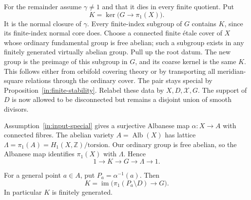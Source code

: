 For the remainder assume \(\gamma\ne1\) and that it dies in every
finite quotient.  Put
\[
 K=\ker\bigl(G\longrightarrow\pi_1(X)\bigr).
\]
It is the normal closure of \(\gamma\).  Every finite-index subgroup
of \(G\) contains \(K\), since its finite-index normal core does.
Choose a connected finite \'{e}tale cover of \(X\) whose ordinary
fundamental group is free abelian; such a subgroup exists in any
finitely generated virtually abelian group.  Pull up the root
datum.  The new group is the preimage of this subgroup in \(G\),
and its coarse kernel is the same \(K\).  This follows either from
orbifold covering theory or by transporting all meridian-square
relations through the ordinary cover.  The pair stays special by
Proposition~\ref{in:finite-stability}.  Relabel these data by
\(X,D,\mathcal X,G\).  The support of \(D\) is now allowed to be
disconnected but remains a disjoint union of smooth divisors.

Assumption~\ref{in:input-special} gives a surjective Albanese map
\(\alpha:X\to A\) with connected fibres.  The abelian variety
\(A=\operatorname{Alb}(X)\) has lattice
\(\Lambda=\pi_1(A)=H_1(X,\mathbb Z)/\mathrm{torsion}\).
Our ordinary group is free abelian, so the Albanese map identifies
\(\pi_1(X)\) with \(\Lambda\).  Hence
\begin{equation}\label{in:lattice-extension}
 1\longrightarrow K\longrightarrow G
       \longrightarrow\Lambda\longrightarrow1.
\end{equation}

\begin{proposition}\label{in:kernel}
For a general point \(a\in A\), put \(P_a=\alpha^{-1}(a)\).
Then
\begin{equation}\label{in:kernel-image}
 K=\operatorname{im}\bigl(\pi_1(P_a\setminus D)\longrightarrow G\bigr).
\end{equation}
In particular \(K\) is finitely generated.
\end{proposition}

